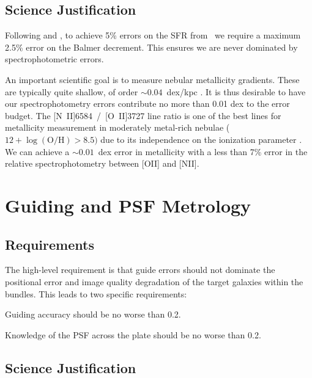 \documentclass[11pt,a4paper,twoside,onecolumn,openany,final,oldfontcommands]{memoir}
\begin{document}
\section{Science Justification}

Following \citet{kennicutt1998} and \citet{calzetti01}, to achieve 5\% errors on the SFR from \Halpha\ we require a maximum 2.5\% error on the Balmer decrement. This ensures we are never dominated by spectrophotometric errors.

An important scientific goal is to measure nebular metallicity gradients. These are typically quite shallow, of order $\sim0.04$~dex/kpc \citep{vanzee1996}. It is thus desirable to have our spectrophotometry errors contribute no more than 0.01 dex to the error budget. The [N~II]6584~/~[O~II]3727 line ratio is one of the best lines for metallicity measurement in moderately metal-rich nebulae ($12 + \log(\mathrm{O/H}) > 8.5)$ due to its independence on the ionization parameter \citep{kewley02}. We can achieve a $\sim0.01$~dex error in metallicity with a less than 7\% error in the relative spectrophotometry between [OII] and [NII].

\chapter{Guiding and PSF Metrology} \label{sec:guiding}

\section{Requirements}

The high-level requirement is that guide errors should not dominate the positional error and image quality degradation of the target galaxies within the bundles. This leads to two specific requirements:

\begin{requirement}

\reqitem Guiding accuracy should be no worse than 0.2\arcsec.
    
\reqitem Knowledge of the PSF across the plate should be no worse than 0.2\arcsec.
    
\end{requirement}

\section{Science Justification}
\end{document}
